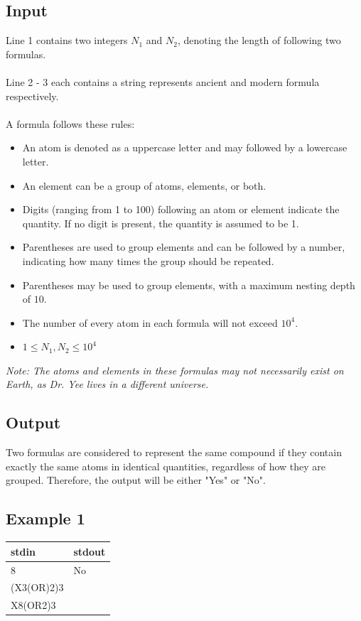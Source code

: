 \documentclass[12pt,a4paper]{article}
\begin{document}
\subsection*{\fontsize{16}{12}Input}
Line 1 contains two integers $N_1$ and $N_2$, denoting the length of following two formulas.
\\\\
\noindent
Line 2 - 3 each contains a string represents ancient and modern formula respectively.\\\\
\noindent
A formula follows these rules:  
\begin{itemize}
    \item An atom is denoted as a uppercase letter and may followed by a lowercase letter. 
    \item An element can be a group of atoms, elements, or both.
    \item Digits (ranging from 1 to 100) following an atom or element indicate the quantity. If no digit is present, the quantity is assumed to be 1.  
    \item Parentheses are used to group elements and can be followed by a number, indicating how many times the group should be repeated.
    \item Parentheses may be used to group elements, with a maximum nesting depth of \( 10 \).
    \item The number of every atom in each formula will not exceed \(10^4\).
    \item $1 \leq N_1, N_2 \leq 10^4$
\end{itemize}  
\noindent
\textit{Note: The atoms and elements in these formulas may not necessarily exist on Earth, as Dr. Yee lives in a different universe.}  


\subsection*{\fontsize{16}{12}Output}
Two formulas are considered to represent the same compound if they contain exactly the same atoms in identical quantities, regardless of how they are grouped. Therefore, the output will be either "Yes" or "No".

\subsection*{\fontsize{16}{12}Example 1}
\begin{table}[h]
  \centering
  \begin{tabularx}{\textwidth}{|>{\ttfamily}X|>{\ttfamily}X|}
    \hline
    stdin & stdout \\
    \hline
    10 8 & No \\
    (X3(OR)2)3 & \\
    X8(OR2)3 &  \\
    \hline
  \end{tabularx}
\end{table}
\end{document}
